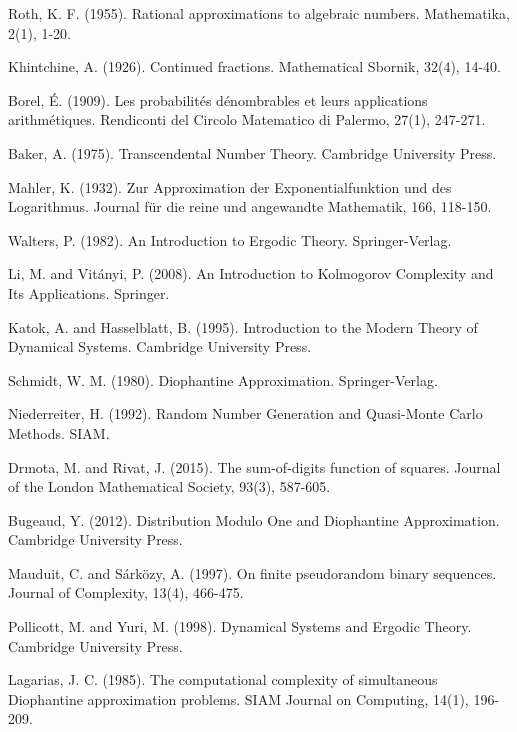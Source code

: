 \begin{thebibliography}{15}
 Roth, K. F. (1955). Rational approximations to algebraic numbers. Mathematika, 2(1), 1-20.

 Khintchine, A. (1926). Continued fractions. Mathematical Sbornik, 32(4), 14-40.

 Borel, É. (1909). Les probabilités dénombrables et leurs applications arithmétiques. Rendiconti del Circolo Matematico di Palermo, 27(1), 247-271.

 Baker, A. (1975). Transcendental Number Theory. Cambridge University Press.

 Mahler, K. (1932). Zur Approximation der Exponentialfunktion und des Logarithmus. Journal für die reine und angewandte Mathematik, 166, 118-150.

 Walters, P. (1982). An Introduction to Ergodic Theory. Springer-Verlag.

 Li, M. and Vitányi, P. (2008). An Introduction to Kolmogorov Complexity and Its Applications. Springer.

 Katok, A. and Hasselblatt, B. (1995). Introduction to the Modern Theory of Dynamical Systems. Cambridge University Press.

 Schmidt, W. M. (1980). Diophantine Approximation. Springer-Verlag.

 Niederreiter, H. (1992). Random Number Generation and Quasi-Monte Carlo Methods. SIAM.

 Drmota, M. and Rivat, J. (2015). The sum-of-digits function of squares. Journal of the London Mathematical Society, 93(3), 587-605.

 Bugeaud, Y. (2012). Distribution Modulo One and Diophantine Approximation. Cambridge University Press.

 Mauduit, C. and Sárközy, A. (1997). On finite pseudorandom binary sequences. Journal of Complexity, 13(4), 466-475.

 Pollicott, M. and Yuri, M. (1998). Dynamical Systems and Ergodic Theory. Cambridge University Press.

 Lagarias, J. C. (1985). The computational complexity of simultaneous Diophantine approximation problems. SIAM Journal on Computing, 14(1), 196-209.

\end{thebibliography}
